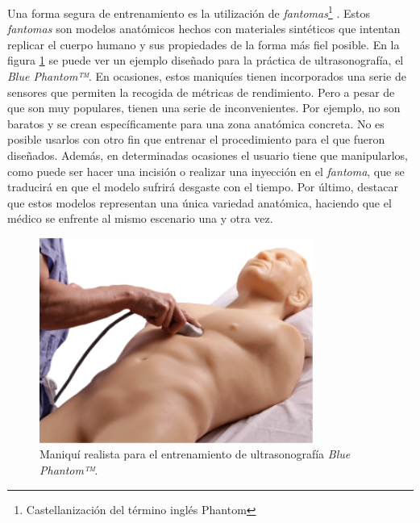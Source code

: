 Una forma segura de entrenamiento es la utilización de \emph{fantomas}\footnote{Castellanización del término inglés Phantom} \cite{phantomra}. 
Estos \emph{fantomas} son modelos anatómicos hechos con materiales sintéticos que intentan replicar el cuerpo humano y sus propiedades de la forma más fiel posible. En la figura \ref{fig:phantom} se puede ver un ejemplo diseñado para la práctica de ultrasonografía, el \emph{Blue Phantom™}\cite{BluePH}. En ocasiones, estos maniquíes tienen incorporados una serie de sensores que permiten la recogida de métricas de rendimiento. Pero a pesar de que son muy populares, tienen una serie de inconvenientes. Por ejemplo, no son baratos y se crean específicamente para una zona anatómica concreta. No es posible usarlos con otro fin que entrenar el procedimiento para el que fueron diseñados. Además, en determinadas ocasiones el usuario tiene que manipularlos, como puede ser hacer una incisión o realizar una inyección en el \emph{fantoma}, que se traducirá en que el modelo sufrirá desgaste con el tiempo. Por último, destacar que estos modelos representan una única variedad anatómica, haciendo que el médico se enfrente al mismo escenario una y otra vez.
\begin{figure}[ht]
   \centering
    \includegraphics[width=0.8\textwidth]{IMG/fast_trauma.jpg}
    \caption{Maniquí realista para el entrenamiento de ultrasonografía  \emph{Blue Phantom™}\cite{BluePH}. }
   \label{fig:phantom}
\end{figure}

